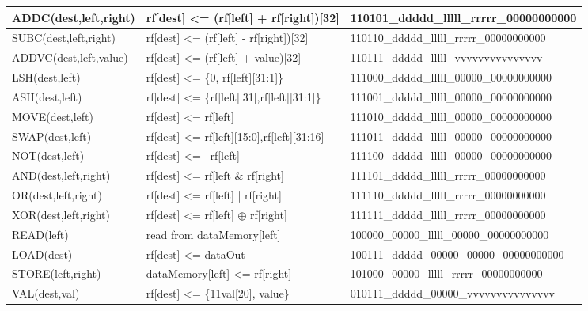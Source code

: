 \begin{table}[H]
\begin{center}
{{\begin{tabular}{|l|l|l|}
      ADDC(dest,left,right)  & rf[dest] <= (rf[left] + rf[right])[32]           & 110101\_ddddd\_lllll\_rrrrr\_00000000000  \\ \hline
      SUBC(dest,left,right)  & rf[dest] <= (rf[left] - rf[right])[32]           & 110110\_ddddd\_lllll\_rrrrr\_00000000000  \\ \hline
      ADDVC(dest,left,value)  & rf[dest] <= (rf[left] + value)[32]              & 110111\_ddddd\_lllll\_vvvvvvvvvvvvvvv     \\ \hline
      LSH(dest,left)        & rf[dest] <= \{0, rf[left][31:1]\}                 & 111000\_ddddd\_lllll\_00000\_00000000000  \\ \hline
      ASH(dest,left)        & rf[dest] <= \{rf[left][31],rf[left][31:1]\}       & 111001\_ddddd\_lllll\_00000\_00000000000  \\ \hline
      MOVE(dest,left)       & rf[dest] <= rf[left]                              & 111010\_ddddd\_lllll\_00000\_00000000000  \\ \hline
      SWAP(dest,left)       & rf[dest] <= {rf[left][15:0],rf[left][31:16]}      & 111011\_ddddd\_lllll\_00000\_00000000000  \\ \hline
      NOT(dest,left)        & rf[dest] <= ~rf[left]                             & 111100\_ddddd\_lllll\_00000\_00000000000  \\ \hline
      AND(dest,left,right)    & rf[dest] <= rf[left \& rf[right]                & 111101\_ddddd\_lllll\_rrrrr\_00000000000  \\ \hline
      OR(dest,left,right)     & rf[dest] <= rf[left] | rf[right]                & 111110\_ddddd\_lllll\_rrrrr\_00000000000  \\ \hline
      XOR(dest,left,right)    & rf[dest] <= rf[left] $\oplus$ rf[right]         & 111111\_ddddd\_lllll\_rrrrr\_00000000000  \\ \hline
      READ(left)            & read from dataMemory[left]                        & 100000\_00000\_lllll\_00000\_00000000000  \\ \hline
      LOAD(dest)            & rf[dest] <= dataOut                               & 100111\_ddddd\_00000\_00000\_00000000000  \\ \hline
      STORE(left,right)     & dataMemory[left] <= rf[right]                     & 101000\_00000\_lllll\_rrrrr\_00000000000  \\ \hline
      VAL(dest,val)         & rf[dest] <= \{{11{val[20]}}, value\}              & 010111\_ddddd\_00000\_vvvvvvvvvvvvvvv     \\ \hline
    \end{tabular}
    }}
  \end{center}
\end{table}

